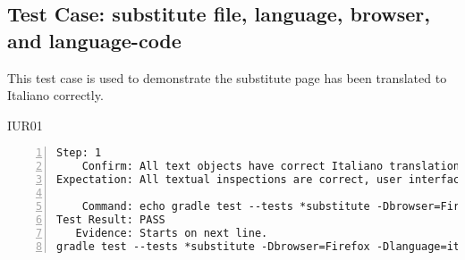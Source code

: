 \subsection{Test Case: substitute file, language, browser, and language-code}
\begin{description}[align=right,leftmargin=*,labelindent=3cm]
\item[Purpose:] This test case is used to demonstrate the substitute page has been translated to Italiano correctly.

\item[Requirement:] IUR01
\end{description}
\begin{lstlisting}[numbers=left]
       Step: 1
    Confirm: All text objects have correct Italiano translations.
Expectation: All textual inspections are correct, user interface screens are captured, and subsutions for [substitute, Italiano, Firefox, it] are accurate.

    Command: echo gradle test --tests *substitute -Dbrowser=Firefox -Dlanguage=it
Test Result: PASS
   Evidence: Starts on next line.
gradle test --tests *substitute -Dbrowser=Firefox -Dlanguage=it

\end{lstlisting}
